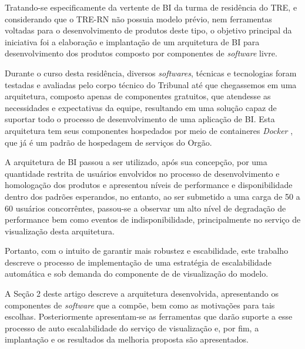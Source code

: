 Tratando-se especificamente da vertente de BI da turma de residência do TRE, e considerando que o TRE-RN não possuia modelo prévio, nem ferramentas voltadas para o desenvolvimento de produtos deste tipo, o objetivo principal da iniciativa foi a elaboração e implantação de um arquitetura de BI para desenvolvimento dos produtos composto por componentes de \textit{software} livre. 

Durante o curso desta residência, diversos \textit{softwares}, técnicas e tecnologias foram testadas e avaliadas pelo corpo técnico do Tribunal até que chegassemos em uma arquitetura, composto apenas de componentes gratuitos, que atendesse as necessidades e expectativas da equipe, resultando em uma solução capaz de suportar todo o processo de desenvolvimento de uma aplicação de BI. Esta arquitetura tem seus componentes hospedados por meio de containeres \textit{Docker} \cite{dockerDoc}, que já é um padrão de hospedagem de serviços do Orgão.

A arquitetura de BI passou a ser utilizado, após sua concepção, por uma quantidade restrita de usuários envolvidos no processo de desenvolvimento e homologação dos produtos e apresentou níveis de performance e disponibilidade dentro dos padrões esperandos, no entanto, ao ser submetido a uma carga de 50 a 60 usuários concorrêntes, passou-se a observar um alto nível de degradação de performance bem como eventos de indisponibilidade, principalmente no serviço de visualização desta arquitetura. 

Portanto, com o intuito de garantir mais robustez e escabilidade, este trabalho descreve o processo de implementação de uma estratégia de escalabilidade automática e sob demanda do componente de de visualização do modelo.  

A Seção 2 deste artigo descreve a arquitetura desenvolvida, apresentando os componentes de \textit{software} que a compõe, bem como as motivações para tais escolhas. Posteriormente apresentam-se as ferramentas que darão suporte a esse processo de auto escalabilidade do serviço de visualização e, por fim, a implantação e os resultados da melhoria proposta são apresentados.